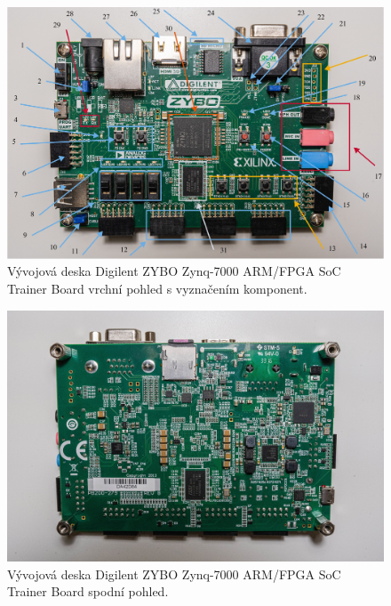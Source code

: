 \documentclass[a4paper, twoside, 11pt]{article}
\begin{document}
				\begin{figure}[H]
					\centering
						\includegraphics[width=1\textwidth]{src/jpg/digilent-zybo-foto-1-oznacene.jpg} 
						\caption{Vývojová deska Digilent ZYBO Zynq-7000 ARM/FPGA SoC Trainer Board vrchní pohled s vyznačením komponent.}
						\label{fig:digilent-zybo-foto-1-oznacene}
				\end{figure}

				\begin{figure}[H]
					\centering
						\includegraphics[width=1\textwidth]{src/jpg/digilent-zybo-foto-3.jpg} 
						\caption{Vývojová deska Digilent ZYBO Zynq-7000 ARM/FPGA SoC Trainer Board spodní pohled.}
						\label{fig:digilent-zybo-foto-3}
				\end{figure}
\end{document}
